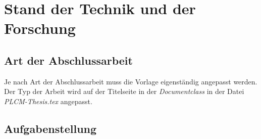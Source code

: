 \cleardoublepage
\chapter{Stand der Technik und der Forschung}
\label{ch:Stand_der_Technik}

\section{Art der Abschlussarbeit}
Je nach Art der Abschlussarbeit muss die Vorlage eigenständig angepasst werden. 
Der Typ der Arbeit wird auf der Titelseite in der \textit{Documentclass} in der Datei \textit{PLCM-Thesis.tex} angepasst.  

\section{Aufgabenstellung}
